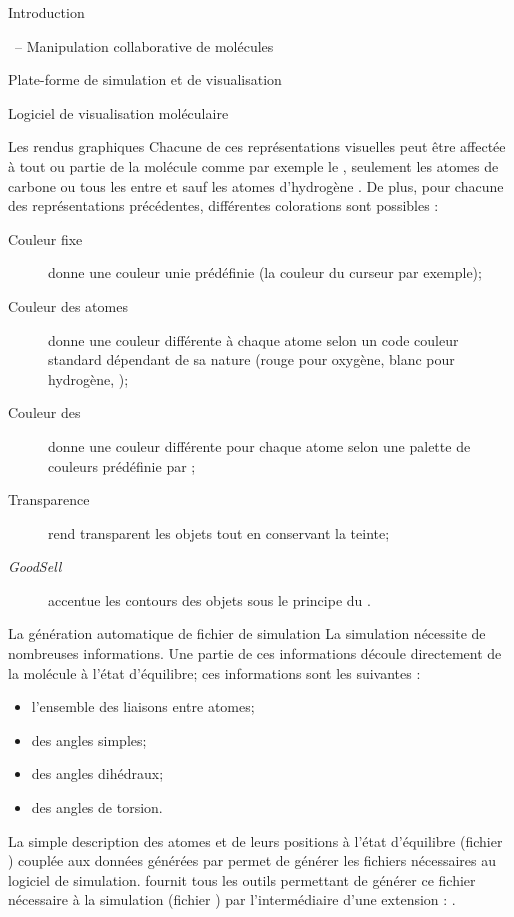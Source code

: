 \documentclass[myfrancais]{mythesis}
\begin{document}
\begin{mypart}{Introduction}
\begin{mychapter}{\myShaddock\ -- Manipulation collaborative de molécules}
\begin{mysection}{Plate-forme de simulation et de visualisation}
\begin{mysubsection}{Logiciel de visualisation moléculaire}
\begin{mysubsubsection}{Les rendus graphiques}
						Chacune de ces représentations visuelles peut être affectée à tout ou partie de la molécule comme par exemple \og le   \fg, \og seulement les atomes de carbone \fg ou \og tous les  entre  et  sauf les atomes d'hydrogène \fg.
						De plus, pour chacune des représentations précédentes, différentes colorations sont possibles :
						\begin{description}
							\item[Couleur fixe] donne une couleur unie prédéfinie (la couleur du curseur par exemple);
							\item[Couleur des atomes] donne une couleur différente à chaque atome selon un code couleur standard dépendant de sa nature (rouge pour oxygène, blanc pour hydrogène, \myetc);
							\item[Couleur des ] donne une couleur différente pour chaque atome selon une palette de couleurs prédéfinie par ;
							\item[Transparence] rend transparent les objets tout en conservant la teinte;
							\item[\textit{GoodSell}] accentue les contours des objets sous le principe du .
						\end{description}
					\end{mysubsubsection}
					\begin{mysubsubsection}{La génération automatique de fichier de simulation}
						La simulation nécessite de nombreuses informations.
						Une partie de ces informations découle directement de la molécule à l'état d'équilibre; ces informations sont les suivantes :
						\begin{itemize}
							\item l'ensemble des liaisons entre atomes;
							\item des angles simples;
							\item des angles dihédraux;
							\item des angles de torsion.
						\end{itemize}
						La simple description des atomes et de leurs positions à l'état d'équilibre (fichier \myPDB) couplée aux données générées par \myCHARMM {} permet de générer les fichiers nécessaires au logiciel de simulation.
						 fournit tous les outils permettant de générer ce fichier nécessaire à la simulation (fichier \myPSF) par l'intermédiaire d'une extension : .

\end{mysubsubsection}
\end{mysubsection}
\end{mysection}
\end{mychapter}
\end{mypart}
\end{document}
